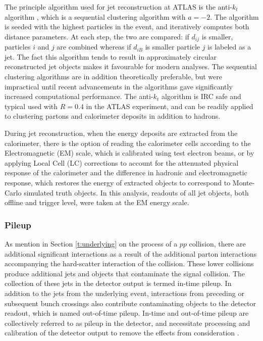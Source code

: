 	The principle algorithm used for jet reconstruction at ATLAS is the anti-$k_t$ algorithm \cite{antikt}, which is a sequential clustering algorithm with $a=-2$. The algorithm is seeded with the highest \pt particles in the event, and iteratively computes both distance parameters. At each step, the two are compared: if $d_{ij}$ is smaller, particles $i$ and $j$ are combined whereas if $d_{iB}$ is smaller particle $j$ is labeled as a jet. The fact this algorithm tends to result in approximately circular reconstructed jet objects makes it favourable for modern analyses. The sequential clustering algorithms are in addition theoretically preferable, but were impractical until recent advancements in the algorithms gave significantly increased computational performance. The anti-$k_t$ algorithm is IRC safe and typical used with $R=0.4$ in the ATLAS experiment, and can be readily applied to clustering partons and calorimeter deposits in addition to hadrons.

	During jet reconstruction, when the energy deposits are extracted from the calorimeter, there is the option of reading the calorimeter cells according to the Electromagnetic (EM) scale, which is calibrated using test electron beams, or by applying Local Cell (LC) corrections to account for the attenuated physical response of the calorimeter and the difference in hadronic and electromagnetic response, which restores the energy of extracted objects to correspond to Monte-Carlo simulated truth objects. In this analysis, readouts of all jet objects, both offline and trigger level, were taken at the EM energy scale.

	\subsubsection{Pileup}

	As mention in Section \ref{t:underlying} on the process of a $pp$ collision, there are additional significant interactions as a result of the additional parton interactions accompanying the hard-scatter interaction of the collision. These lower \pt collisions produce additional jets and objects that contaminate the signal collision. The collection of these jets in the detector output is termed in-time pileup. In addition to the jets from the underlying event, interactions from preceding or subsequent bunch crossings also contribute contaminating objects to the detector readout, which is named out-of-time pileup. In-time and out-of-time pileup are collectively referred to as pileup in the detector, and necessitate processing and calibration of the detector output to remove the effects from consideration \cite{pileup}.

